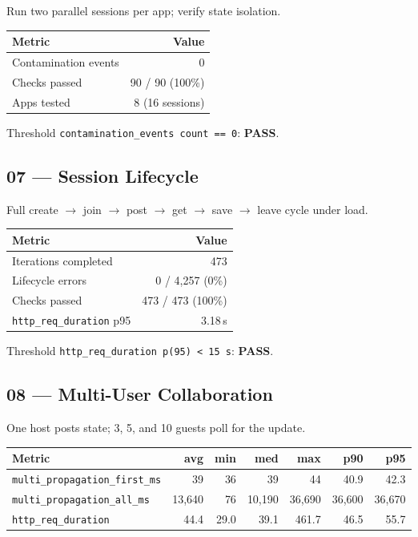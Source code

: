 \documentclass[11pt,a4paper]{article}
\newcommand{\pass}{\textcolor{pass}{\textbf{PASS}}}
\begin{document}
Run two parallel sessions per app; verify state isolation.

\begin{tabular}{@{}lr@{}}
\toprule
\textbf{Metric} & \textbf{Value} \\
\midrule
Contamination events & 0 \\
Checks passed        & 90 / 90 (100\%) \\
Apps tested          & 8 (16 sessions) \\
\bottomrule
\end{tabular}

\medskip
\noindent Threshold \texttt{contamination\_events count == 0}: \pass.

\subsection{07 — Session Lifecycle}

Full create $\to$ join $\to$ post $\to$ get $\to$ save $\to$ leave cycle under load.

\begin{tabular}{@{}lr@{}}
\toprule
\textbf{Metric} & \textbf{Value} \\
\midrule
Iterations completed & 473 \\
Lifecycle errors     & 0 / 4,257 (0\%) \\
Checks passed        & 473 / 473 (100\%) \\
\texttt{http\_req\_duration} p95 & 3.18\,s \\
\bottomrule
\end{tabular}

\medskip
\noindent Threshold \texttt{http\_req\_duration p(95) < 15\,s}: \pass.

\subsection{08 — Multi-User Collaboration}

One host posts state; 3, 5, and 10 guests poll for the update.

\begin{tabular}{@{}lrrrrrr@{}}
\toprule
\textbf{Metric} & \textbf{avg} & \textbf{min} & \textbf{med} & \textbf{max} & \textbf{p90} & \textbf{p95} \\
\midrule
\texttt{multi\_propagation\_first\_ms} & 39    & 36   & 39    & 44     & 40.9  & 42.3  \\
\texttt{multi\_propagation\_all\_ms}   & 13,640 & 76  & 10,190 & 36,690 & 36,600 & 36,670 \\
\texttt{http\_req\_duration}           & 44.4  & 29.0 & 39.1  & 461.7  & 46.5  & 55.7  \\
\bottomrule
\end{tabular}
\end{document}
